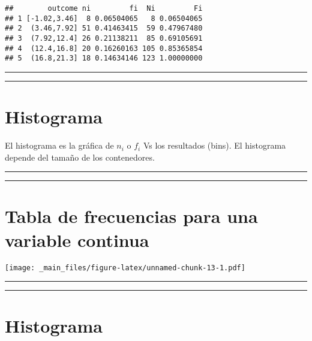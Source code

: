\documentclass[
]{book}
\begin{document}
\begin{verbatim}
##        outcome ni         fi  Ni         Fi
## 1 [-1.02,3.46]  8 0.06504065   8 0.06504065
## 2  (3.46,7.92] 51 0.41463415  59 0.47967480
## 3  (7.92,12.4] 26 0.21138211  85 0.69105691
## 4  (12.4,16.8] 20 0.16260163 105 0.85365854
## 5  (16.8,21.3] 18 0.14634146 123 1.00000000
\end{verbatim}

\begin{center}\rule{0.5\linewidth}{0.5pt}\end{center}

\begin{center}\rule{0.5\linewidth}{0.5pt}\end{center}

\hypertarget{histograma}{%
\section{Histograma}\label{histograma}}

El histograma es la gráfica de \(n_i\) o \(f_i\) Vs los resultados (bins). El histograma depende del tamaño de los contenedores.

\begin{center}\rule{0.5\linewidth}{0.5pt}\end{center}

\begin{center}\rule{0.5\linewidth}{0.5pt}\end{center}

\hypertarget{tabla-de-frecuencias-para-una-variable-continua-1}{%
\section{Tabla de frecuencias para una variable continua}\label{tabla-de-frecuencias-para-una-variable-continua-1}}

\texttt{[image: \_main\_files/figure-latex/unnamed-chunk-13-1.pdf]}

\begin{center}\rule{0.5\linewidth}{0.5pt}\end{center}

\begin{center}\rule{0.5\linewidth}{0.5pt}\end{center}

\hypertarget{histograma-1}{%
\section{Histograma}\label{histograma-1}}
\end{document}
